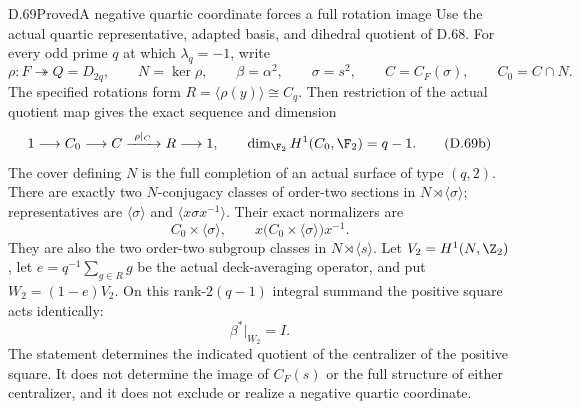 \begin{claim}{D.69}{Proved}{A negative quartic coordinate forces a full rotation image}
Use the actual quartic representative, adapted basis, and dihedral
quotient of D.68. For every odd prime $q$ at which $\lambda_q=-1$,
write
\[
 \rho:F\twoheadrightarrow Q=D_{2q},\qquad
 N=\ker\rho,\qquad \beta=\alpha^2,\qquad
 \sigma=s^2,\qquad C=C_F(\sigma),\qquad C_0=C\cap N.
                                                               \tag{D.69a}
\]
The specified rotations form $R=\langle\rho(y)\rangle\cong C_q$.
Then restriction of the actual quotient map gives the exact
sequence and dimension
\[
 1\longrightarrow C_0\longrightarrow C
       \xrightarrow{\ \rho|_C\ }R\longrightarrow1,\qquad
                  \dim_{\F_2}H^1(C_0,\F_2)=q-1.             \tag{D.69b}
\]
The cover defining $N$ is the full completion of an actual
surface of type $(q,2)$.
There are exactly two $N$-conjugacy classes of order-two
sections in $N\rtimes\langle\sigma\rangle$; representatives are
$\langle\sigma\rangle$ and
$\langle x\sigma x^{-1}\rangle$.
Their exact normalizers are
\[
 C_0\times\langle\sigma\rangle,\qquad
 x\bigl(C_0\times\langle\sigma\rangle\bigr)x^{-1}.
                                                               \tag{D.69c}
\]
They are also the two order-two subgroup classes in
$N\rtimes\langle s\rangle$.
Let $V_2=H^1(N,\Z_2)$, let
$e=q^{-1}\sum_{g\in R}g$ be the actual deck-averaging
operator, and put $W_2=(1-e)V_2$.
On this rank-$2(q-1)$ integral summand the positive
square acts identically:
\[
                         \beta^*|_{W_2}=I.                 \tag{D.69y}
\]
The statement determines the indicated quotient of the
centralizer of the positive square. It does not determine
the image of $C_F(s)$ or the full structure of either
centralizer, and it does not exclude or realize a negative
quartic coordinate.
\end{claim}
